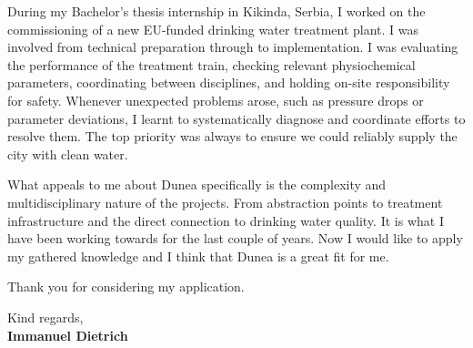 \documentclass[11pt]{report}
\begin{document}
\begin{titlepage}
\vspace{0.7em}

During my Bachelor's thesis internship in Kikinda, Serbia, I worked on the commissioning of a new EU-funded drinking water treatment plant. I was involved from technical preparation through to implementation. 
I was evaluating the performance of the treatment train, checking relevant physiochemical parameters, coordinating between disciplines, and holding on-site responsibility for safety. Whenever unexpected problems 
arose, such as pressure drops or parameter deviations, I learnt to systematically diagnose and coordinate efforts to resolve them. The top priority was always to ensure we could reliably supply the city with clean water. 

\vspace{0.7em}

What appeals to me about Dunea specifically is the complexity and multidisciplinary nature of the projects. From abstraction points to treatment infrastructure and the direct connection to drinking water quality. 
It is what I have been working towards for the last couple of years. Now I would like to apply my gathered knowledge and I think that Dunea is a great fit for me. 

\vspace{0.7em}

Thank you for considering my application.

\vspace{0.7em}

\raggedright Kind regards,\\
\textbf{Immanuel Dietrich}

\end{titlepage}
\end{document}
